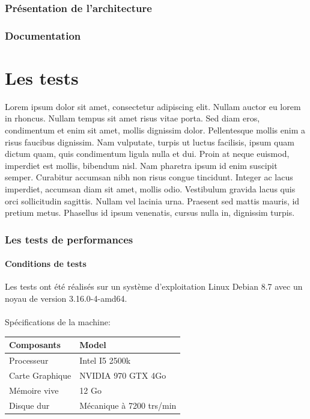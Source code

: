 \documentclass[12pt]{article}
\begin{document}
	\section{Présentation de l'architecture}
	\section{Documentation}

\part{Les tests}
Lorem ipsum dolor sit amet, consectetur adipiscing elit. Nullam auctor eu lorem in rhoncus. Nullam tempus sit amet risus vitae porta. Sed diam eros, condimentum et enim sit amet, mollis dignissim dolor. Pellentesque mollis enim a risus faucibus dignissim. Nam vulputate, turpis ut luctus facilisis, ipsum quam dictum quam, quis condimentum ligula nulla et dui. Proin at neque euismod, imperdiet est mollis, bibendum nisl. Nam pharetra ipsum id enim suscipit semper. Curabitur accumsan nibh non risus congue tincidunt. Integer ac lacus imperdiet, accumsan diam sit amet, mollis odio. Vestibulum gravida lacus quis orci sollicitudin sagittis. Nullam vel lacinia urna. Praesent sed mattis mauris, id pretium metus. Phasellus id ipsum venenatis, cursus nulla in, dignissim turpis.

	\section{Les tests de performances}
		\subsection{Conditions de tests}
		Les tests ont été réalisés sur un système d’exploitation Linux Debian 8.7 avec un noyau de version 3.16.0-4-amd64. \\ \\
		Spécifications de la machine: \\
		\begin{center}
			\begin{tabular}{| l | l |}
			\hline
			\textbf{Composants} & \textbf{Model} \\ \hline
			Processeur & Intel I5 2500k \\ \hline
			Carte Graphique & NVIDIA 970 GTX 4Go \\ \hline
			Mémoire vive & 12 Go \\ \hline
			Disque dur & Mécanique à 7200 trs/min \\ \hline
		    \end{tabular}
	    \end{center}
	    
\end{document}

